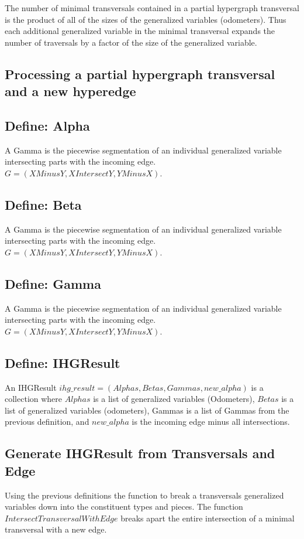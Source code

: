 The number of minimal transversals contained in a partial hypergraph transversal is the product of all of the sizes of the generalized variables (odometers). Thus each additional generalized variable in the minimal transversal expands the number of traversals by a factor of the size of the generalized variable.\\

\subsection{Processing a partial hypergraph transversal and a new hyperedge}


\subsection{Define: Alpha}
A Gamma is the piecewise segmentation of an individual generalized variable intersecting parts with the incoming edge. $G = (XMinusY, XIntersectY, YMinusX)$.

\subsection{Define: Beta}
A Gamma is the piecewise segmentation of an individual generalized variable intersecting parts with the incoming edge. $G = (XMinusY, XIntersectY, YMinusX)$.

\subsection{Define: Gamma}
A Gamma is the piecewise segmentation of an individual generalized variable intersecting parts with the incoming edge. $G = (XMinusY, XIntersectY, YMinusX)$.


\subsection{Define: IHGResult }
An IHGResult $ihg\_result = (Alphas,Betas,Gammas,new\_alpha)$ is a collection where $Alphas$ is a list of generalized variables (Odometers), $Betas$ is a list of generalized variables (odometers), Gammas is a list of Gammas from the previous definition, and $new\_alpha$ is the incoming edge minus all 
intersections.


\newpage
\subsection{Generate IHGResult from Transversals and Edge}
Using the previous definitions the function to break a transversals generalized variables down into the constituent types and pieces. The function $IntersectTransversalWithEdge$ breaks apart the entire intersection of a minimal transversal with a new edge. 



